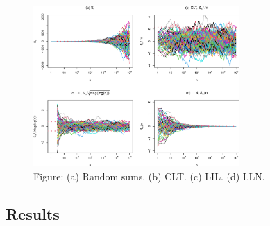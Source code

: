 \documentclass[
  13pt,
  letterpaper,
  DIV=11,
  numbers=noendperiod]{scrreprt}
\theoremstyle{definition}
\theoremstyle{plain}
\theoremstyle{definition}
\theoremstyle{plain}
\theoremstyle{plain}
\theoremstyle{definition}
\theoremstyle{remark}
\begin{document}
\begin{figure}[th]

{\centering \includegraphics[width=0.7\textwidth,height=\textheight]{lil_files/figure-pdf/unnamed-chunk-2-1.pdf}

}

\caption{Figure: (a) Random sums. (b) CLT. (c) LIL. (d) LLN.}

\end{figure}%

\subsection{Results}\label{results}
\end{document}
